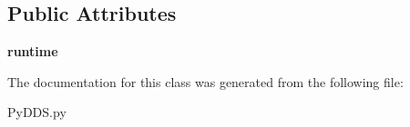 \subsection*{Public Attributes}
\begin{DoxyCompactItemize}
\item 
\hypertarget{classddswrapper_1_1_py_d_d_s_1_1_py_d_d_s_aff2b6b2ee883b9f82d063d4d8cbedb9f}{
{\bfseries runtime}}
\label{classddswrapper_1_1_py_d_d_s_1_1_py_d_d_s_aff2b6b2ee883b9f82d063d4d8cbedb9f}

\end{DoxyCompactItemize}


The documentation for this class was generated from the following file:\begin{DoxyCompactItemize}
\item 
PyDDS.py\end{DoxyCompactItemize}
